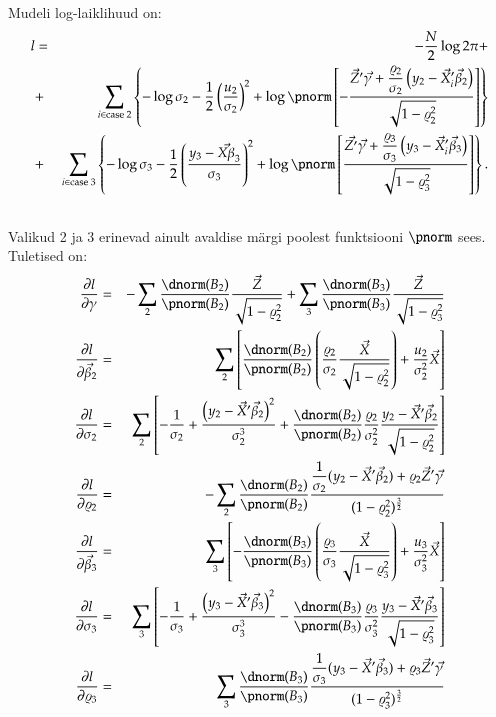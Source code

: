 \documentclass[a4paper]{article}
\numberwithin{equation}{subsection}
\begin{document}
Mudeli log-laiklihuud on:
\begin{eqnarray}
l &=& -\frac{N}{2}\log 2\pi + \nonumber\\
&+& \sum_{i \in \text{case 2}} \left\{
  -\log\sigma_2
  -\frac{1}{2}\left( \frac{u_2}{\sigma_2} \right)^2
  +\log \pnorm \left[ -\frac
    {\vec{Z}'\vec{\gamma} + \displaystyle \frac{\varrho_2}{\sigma_2}
      \left( y_2 - \vec{X}_i'\vec{\beta}_2 \right)}
    {\sqrt{ 1 - \varrho_2^2}} \right] \right\} \nonumber\\
&+& \sum_{i \in \text{case 3}} \left\{
  -\log\sigma_3
  -\frac{1}{2}\left( \frac{y_3 - \vec{X\beta}_3}{\sigma_3} \right)^2
  +\log \pnorm \left[ \frac
    {\vec{Z'}\vec{\gamma} + \displaystyle \frac{\varrho_3}{\sigma_3}
      \left( y_3 - \vec{X}_i'\vec{\beta}_3 \right)}
    {\sqrt{ 1 - \varrho_3^2}} \right] \right\}. \nonumber\\
&&
\end{eqnarray}
Valikud 2 ja 3 erinevad ainult avaldise märgi poolest funktsiooni
$\pnorm$ sees. Tuletised on:
\begin{eqnarray}
\frac{\partial l}{\partial \gamma} & = &
  -\sum_2 \frac{\dnorm(B_2)}{\pnorm(B_2)}
    \frac{\vec{Z}}{\sqrt{1-\varrho_2^2}}
  +\sum_3 \frac{\dnorm(B_3)}{\pnorm(B_3)}
    \frac{\vec{Z}}{\sqrt{1-\varrho_3^2}} \\
\frac{\partial l}{\partial \vec{\beta}_2} & = &
  \sum_2 \left[
    \frac{\dnorm(B_2)}{\pnorm(B_2)} \left(
      \frac{\varrho_2}{\sigma_2}
      \frac{\vec{X}}{\sqrt{1-\varrho_2^2}} \right)
    +\frac{u_2}{\sigma_2^2}\vec{X}
    \right] \\
\frac{\partial l}{\partial \sigma_2} & = &
  \sum_2 \left[
    -\frac{1}{\sigma_2}
    +\frac{ \left( y_2 - \vec{X}'\vec{\beta}_2 \right)^2}
      {\sigma_2^3}
    +\frac{\dnorm(B_2)}{\pnorm(B_2)}
    \frac{\varrho_2}{\sigma_2^2}
    \frac{y_2 - \vec{X}'\vec{\beta}_2}{\sqrt{1-\varrho_2^2}}
    \right] \\
\frac{\partial l}{\partial \varrho_2} & = &
  -\sum_2
    \frac{\dnorm(B_2)}{\pnorm(B_2)}
    \frac{ \displaystyle \frac{1}{\sigma_2}
        ( y_2 - \vec{X}'\vec{\beta}_2) + \varrho_2 \vec{Z}'\vec{\gamma}}
      {( 1 - \varrho_2^2)^{\frac{3}{2}}}\\
\frac{\partial l}{\partial \vec{\beta}_3} & = &
  \sum_3 \left[
    -\frac{\dnorm(B_3)}{\pnorm(B_3)} \left(
      \frac{\varrho_3}{\sigma_3}
      \frac{\vec{X}}{\sqrt{1-\varrho_3^2}} \right)
    +\frac{u_3}{\sigma_3^2}\vec{X}
    \right] \\
\frac{\partial l}{\partial \sigma_3} & = &
  \sum_3 \left[
    -\frac{1}{\sigma_3}
    +\frac{ \left( y_3 - \vec{X}'\vec{\beta}_3 \right)^2}
      {\sigma_3^3}
    -\frac{\dnorm(B_3)}{\pnorm(B_3)}
    \frac{\varrho_3}{\sigma_3^2}
    \frac{y_3 - \vec{X}'\vec{\beta}_3}{\sqrt{1-\varrho_3^2}}
    \right] \\
\frac{\partial l}{\partial \varrho_3} & = &
  \sum_3
    \frac{\dnorm(B_3)}{\pnorm(B_3)}
    \frac{ \displaystyle \frac{1}{\sigma_3}
        ( y_3 - \vec{X}'\vec{\beta}_3) + \varrho_3 \vec{Z}'\vec{\gamma}}
      {( 1 - \varrho_3^2)^{\frac{3}{2}}}
\end{eqnarray}
\end{document}
